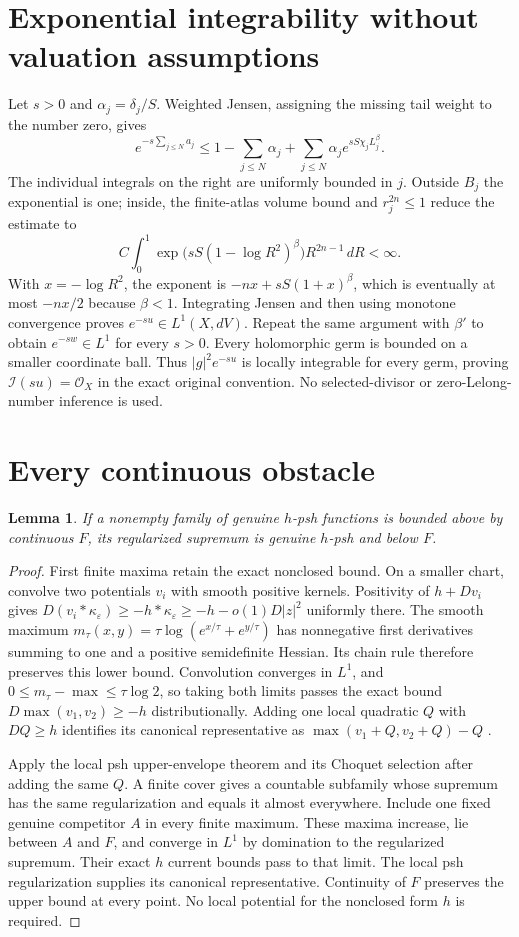\documentclass[11pt]{article}
\newtheorem{lemma}[theorem]{Lemma}
\theoremstyle{remark}\newtheorem{remark}[theorem]{Remark}
\newcommand{\ddc}{D}
\newcommand{\OO}{\mathcal O_X}
\begin{document}
\section{Exponential integrability without valuation assumptions}
Let $s>0$ and $\alpha_j=\delta_j/S$. Weighted Jensen, assigning the
missing tail weight to the number zero, gives
\[
 e^{-s\sum_{j\leq N}a_j}
 \leq1-\sum_{j\leq N}\alpha_j
       +\sum_{j\leq N}\alpha_j e^{sS\chi_j L_j^\beta}.
\]
The individual integrals on the right are uniformly bounded in $j$.
Outside $B_j$ the exponential is one; inside, the finite-atlas volume
bound and $r_j^{2n}\leq1$ reduce the estimate to
\[
 C\int_0^1\exp\bigl(sS(1-\log R^2)^\beta\bigr)R^{2n-1}\,dR<\infty.
\]
With $x=-\log R^2$, the exponent is $-nx+sS(1+x)^\beta$,
which is eventually at most $-nx/2$ because $\beta<1$.
Integrating Jensen and then using monotone convergence proves
$e^{-su}\in L^1(X,dV)$. Repeat the same argument with $\beta'$ to
obtain $e^{-sw}\in L^1$ for every $s>0$. Every holomorphic germ is bounded
on a smaller coordinate ball. Thus $|g|^2e^{-su}$ is locally integrable
for every germ, proving $\mathcal I(su)=\OO$ in the exact original
convention. No selected-divisor or zero-Lelong-number inference is used.

\section{Every continuous obstacle}
\begin{lemma}\label{lem:envelope}
If a nonempty family of genuine $h$-psh functions is bounded above by
continuous $F$, its regularized supremum is genuine $h$-psh and below $F$.
\end{lemma}
\begin{proof}
First finite maxima retain the exact nonclosed bound. On a smaller chart,
convolve two potentials $v_i$ with smooth positive kernels. Positivity of
$h+\ddc v_i$ gives $\ddc(v_i*\kappa_\varepsilon)
\geq-h*\kappa_\varepsilon\geq-h-o(1)\ddc|z|^2$ uniformly there.
The smooth maximum
$m_\tau(x,y)=\tau\log(e^{x/\tau}+e^{y/\tau})$ has nonnegative first
derivatives summing to one and a positive semidefinite Hessian. Its
chain rule therefore preserves this lower bound. Convolution converges
in $L^1$, and $0\leq m_\tau-\max\leq\tau\log2$, so taking both limits
passes the exact bound $\ddc\max(v_1,v_2)\geq-h$ distributionally.
Adding one local quadratic $Q$ with $\ddc Q\geq h$ identifies its
canonical representative as $\max(v_1+Q,v_2+Q)-Q$
\cite[Theorem I.5.6]{Dem}.

Apply the local psh upper-envelope theorem and its Choquet selection
\cite[Theorems I.4.23 and I.5.7 and their proofs]{Dem} after adding the same $Q$.
A finite cover gives a countable subfamily whose supremum has the same
regularization and equals it almost everywhere. Include one fixed
genuine competitor $A$ in every finite maximum. These maxima increase,
lie between $A$ and $F$, and converge in $L^1$ by domination to the
regularized supremum. Their exact $h$ current bounds pass to that limit.
The local psh regularization supplies its canonical representative.
Continuity of $F$ preserves the upper bound at every point. No local
potential for the nonclosed form $h$ is required.
\end{proof}
\end{document}
